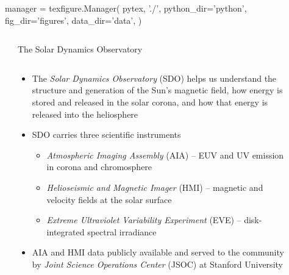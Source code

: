 \documentclass[final,12pt]{beamer}
\newlength{\sepwidth}
\newlength{\colwidth}
\newcommand{\separatorcolumn}{\begin{column}{\sepwidth}\end{column}}
\begin{document}
\begin{pycode}[manager]
manager = texfigure.Manager(
    pytex, './',
    python_dir='python',
    fig_dir='figures',
    data_dir='data',
)
\end{pycode}

\begin{frame}[fragile,t]
\begin{columns}[T]
\separatorcolumn

\begin{column}{\colwidth}

  \begin{block}{The Solar Dynamics Observatory}
    \begin{columns}
      \begin{column}{0.6667\columnwidth}
        \begin{itemize}
          \item The \alert{\textit{Solar Dynamics Observatory} (SDO)} \citep{pesnell_solar_2012} helps us understand the structure and generation of the Sun's magnetic field, how energy is stored and released in the solar corona, and how that energy is released into the heliosphere
          \item SDO carries three scientific instruments
          \begin{itemize}
            \item \alert{\textit{Atmospheric Imaging Assembly} (AIA)} -- EUV and UV emission in corona and chromosphere
            \item \alert{\textit{Helioseismic and Magnetic Imager} (HMI)} -- magnetic and velocity fields at the solar surface
            \item \textit{Extreme Ultraviolet Variability Experiment} (EVE) -- disk-integrated spectral irradiance
          \end{itemize}
          \item AIA and HMI data publicly available and served to the community by \alert{\textit{Joint Science Operations Center} (JSOC)} \citep{couvidat_observables_2016} at Stanford University 
        \end{itemize}
      \end{column}
      \begin{column}{0.3\columnwidth}
        \begin{figure}
          \centering

\end{figure}
\end{column}
\end{columns}
\end{block}
\end{column}
\end{columns}
\end{frame}
\end{document}
